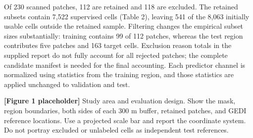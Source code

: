 Of 230 scanned patches, 112 are retained and 118 are excluded. The retained subsets contain 7,522 supervised cells (Table 2), leaving 541 of the 8,063 initially usable cells outside the retained sample. Filtering changes the empirical subset sizes substantially: training contains 99 of 112 patches, whereas the test region contributes five patches and 163 target cells. Exclusion reason totals in the supplied report do not fully account for all rejected patches; the complete candidate manifest is needed for the final accounting. Each predictor channel is normalized using statistics from the training region, and those statistics are applied unchanged to validation and test.

\textbf{[Figure 1 placeholder]} Study area and evaluation design. Show the mask, region boundaries, both sides of each 300 m buffer, retained patches, and GEDI reference locations. Use a projected scale bar and report the coordinate system. Do not portray excluded or unlabeled cells as independent test references.

